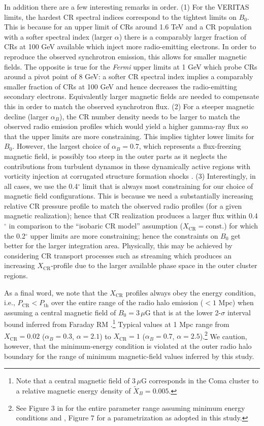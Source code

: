 \documentclass[12pt,manuscript]{aastex}
\newcommand{\rmn}{\mathrm}
\newcommand{\CR}{\mathrm{CR}}
\begin{document}
In addition there are a few interesting remarks in order. (1) For the VERITAS limits, the hardest CR spectral indices correspond to the tightest limits on $B_0$. This is because for an upper limit of CRs around 1.6 TeV and a CR population with a softer spectral index (larger $\alpha$) there is a comparably larger fraction of CRs at 100 GeV available which inject more radio-emitting electrons. In order to reproduce the observed synchrotron emission, this allows for smaller magnetic fields. The opposite is true for the {\em Fermi} upper limits at 1 GeV which probe CRs around a pivot point of 8 GeV: a softer CR spectral index implies a comparably smaller fraction of CRs at 100 GeV and hence decreases the radio-emitting secondary electrons. Equivalently larger magnetic fields are needed to compensate this in order to match the observed synchrotron flux.  (2) For a steeper magnetic decline (larger $\alpha_{B}$), the CR number density needs to be larger to match the observed radio emission profiles which would yield a higher gamma-ray flux so that the upper limits are more constraining. This implies tighter lower limits for $B_{0}$. However, the largest choice of $\alpha_B=0.7$, which represents a flux-freezing magnetic field, is possibly too steep in the outer parts as it neglects the contributions from turbulent dynamos in these dynamically active regions with vorticity injection at corrugated structure formation shocks \citep{article:PfrommerJones:2011}. (3) Interestingly, in all cases, we use the 0.4$^{\circ}$ limit that is always most constraining for our choice of magnetic field configurations.  This is because we need a substantially increasing relative CR pressure profile to match the observed radio profiles (for a given magnetic realization); hence that CR realization produces a larger flux within 0.4$^{\circ}$ in comparison to the ``isobaric CR model'' assumption ($X_{\CR} = \rmn{const.}$) for which the 0.2$^{\circ}$ upper limits are more constraining; hence the
constraints on $B_{0}$ get better for the larger integration area. Physically, this may be achieved by considering CR transport processes such as streaming which produces an increasing $X_{\CR}$-profile due to the larger available phase space in the outer cluster regions.

As a final word, we note that the $X_{\CR}$ profiles always obey the energy condition, i.e., $P_{\CR} < P_{\mathrm{th}}$ over the entire range of the radio halo emission ($< 1$ Mpc) when assuming a central magnetic field of $B_{0}=3\,\mu$G that is at the lower 2-$\sigma$ interval bound inferred from Faraday RM \citep{article:Bonafede_etal:2010}.\footnote{Note that a central magnetic field of $3\,\mu$G corresponds in the Coma cluster to a relative magnetic energy density of $\tilde{X}_B=0.005$.} Typical values at 1 Mpc range from $X_{\CR} = 0.02$ ($\alpha_{B}=0.3$, $\alpha=2.1$) to $X_{\CR} = 1$ ($\alpha_{B}=0.7$, $\alpha=2.5$).\footnote{See Figure 3 in \citet{article:PfrommerEnsslin:2004a} for the entire parameter range assuming minimum energy conditions and \citet{article:PfrommerEnsslin:2004b}, Figure 7 for a parametrization as adopted in this study.} We caution, however, that the minimum-energy condition is violated at the outer radio halo boundary for the range of minimum
magnetic-field values inferred by this study.
\end{document}
